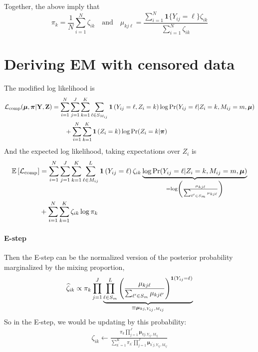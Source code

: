 \documentclass[11pt]{article}
\begin{document}
\begin{appendices}
Together, the above imply that
\begin{equation}
\pi_{k} = \frac{1}{N}\sum^{N}_{i=1}\zeta_{ik}\quad
\text{and}\quad
\mu_{kj\ell} =
\frac{\sum^{N}_{i=1}\bm{1}\{Y_{ij} = \ell\}\zeta_{ik}}{\sum^{N}_{i=1}\zeta_{ik}}
\end{equation}


\section{Deriving EM with censored data \label{sec:EM-deriv_censored}}

The modified log likelihood is
\begin{align}
\mathcal{L}_{\text{comp}}(\bm{\mu}, \bm{\pi}|\mathbf{Y}, \mathbf{Z}) & = \sum^{N}_{i=1}\sum^{J}_{j=1}\sum^{K}_{k=1}\sum^{}_{\ell \in S_{M_{ij}}}
\bm{1}\left(Y_{ij} = \ell, Z_{i} = k\right)
\log \Pr(Y_{ij} = \ell | Z_{i} = k,  M_{ij} = m, \bm{\mu})\nonumber\\
& \qquad +
\sum^N_{i=1}\sum^{K}_{k=1}\bm{1}\left(Z_{i} = k\right)\log \Pr(Z_{i} = k | \bm{\pi})\nonumber
\end{align}
And the expected log likelihood, taking expectations over \(Z_i\) is
\begin{align}
\mathbb{E}\left[\mathcal{L}_{\text{comp}}\right] &= \sum^{N}_{i=1}\sum^{J}_{j=1}\sum^{K}_{k=1}\sum^{L}_{\ell \in M_{ij}}\bm{1}\left(Y_{ij} = \ell\right)\zeta_{ik}\underbrace{\log \Pr(Y_{ij} = \ell | Z_{i} = k, M_{ij} = m, \bm{\mu})}_{=\log \left(\frac{\mu_{kj\ell}}{\sum_{\ell^\prime \in S_{m}} \mu_{kj\ell}}\right)}\nonumber\\
& + \sum^{N}_{i=1}\sum^{K}_{k=1}\zeta_{ik}\log {\pi}_{k}
\end{align}

\paragraph{E-step} Then the E-step can be the normalized version of the posterior probability marginalized by the mixing proportion,
\begin{align}
\widehat{\zeta}_{ik} \propto \pi_k\prod^{J}_{j = 1}\underbrace{\prod^{L}_{\ell \in S_m}\left(\frac{\mu_{kj\ell}}{\sum_{\ell^\prime \in S_{m}} \mu_{kj\ell^\prime}}\right)^{\bm{1}\left(Y_{ij} = \ell\right)}}_{\equiv \bm{\mu}_{kj, Y_{ij}, M_{ij}}}
\end{align}
So in the E-step, we would be updating by this probability:
\begin{align}
\zeta_{ik} \leftarrow \frac{{\pi}_{k}\prod^{J}_{j=1}\bm{\mu}_{kj,Y_{ij}, M_{ij}}}
{\sum^{K}_{k^\prime=1}{\pi}_{k^\prime}\prod^{J}_{j=1}\bm{\mu}_{k^\prime j,Y_{ij}, M_{ij}}}
\end{align}


\end{appendices}
\end{document}
